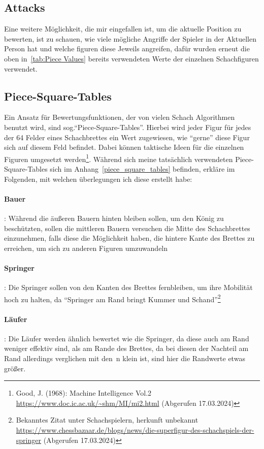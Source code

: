\documentclass[12pt, a4paper, oneside, openright]{article}
\newcommand \sog{sog.\xspace }
\begin{document}
\subsection{Attacks}\label{subsec:attacks}
Eine weitere Möglichkeit, die mir eingefallen ist, um die aktuelle Position zu bewerten, ist zu schauen, wie viele mögliche Angriffe der Spieler in der Aktuellen Person hat und welche figuren diese Jeweils angreifen, dafür wurden erneut die oben in~\ref{tab:Piece Values} bereits verwendeten Werte der einzelnen Schachfiguren verwendet.
\subsection{Piece-Square-Tables}\label{subsec:piece-tables}
Ein Ansatz für Bewertungsfunktionen, der von vielen Schach Algorithmen benutzt wird, sind \sog \enquote{Piece-Square-Tables}.
Hierbei wird jeder Figur für jedes der 64 Felder eines Schachbrettes ein Wert zugewiesen, wie \enquote{gerne} diese Figur sich auf diesem Feld befindet.
Dabei können taktische Ideen für die einzelnen Figuren umgesetzt werden\footnote{Good, J. (1968): Machine Intelligence Vol.2 \url{https://www.doc.ic.ac.uk/~shm/MI/mi2.html} (Abgerufen 17.03.2024)}.
Während sich meine tatsächlich verwendeten Piece-Square-Tables sich im Anhang~\ref{piece_square_tables} befinden, erkläre im Folgenden, mit welchen überlegungen ich diese erstellt habe:
\paragraph{Bauer}:
Während die äußeren Bauern hinten bleiben sollen, um den König zu beschützten, sollen die mittleren Bauern  versuchen die Mitte des Schachbrettes einzunehmen, falls diese die Möglichkeit haben, die hintere Kante des Brettes zu erreichen, um sich zu anderen Figuren umzuwandeln
\paragraph{Springer}\label{par:springer}:
 Die Springer sollen von den Kanten des Brettes fernbleiben, um ihre Mobilität hoch zu halten, da \enquote{Springer am Rand bringt Kummer und Schand}\footnote{Bekanntes Zitat unter Schachspielern, herkunft unbekannt \url{https://www.chessbazaar.de/blogs/news/die-superfigur-des-schachspiels-der-springer} (Abgerufen 17.03.2024)}
\paragraph{Läufer}:
Die Läufer werden ähnlich bewertet wie die Springer, da diese auch am Rand weniger effektiv sind, als am Rande des Brettes, da bei diesen der Nachteil am Rand allerdings verglichen mit den~n klein ist, sind hier die Randwerte etwas größer.
\end{document}
